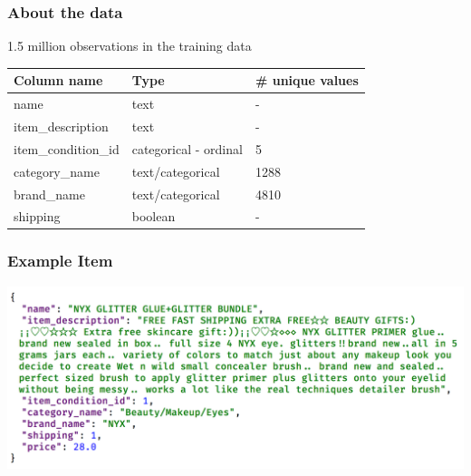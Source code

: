 \begin{frame}
\frametitle{About the data}


1.5 million observations in the training data 

\hfill \break

\begin{tabular}{lll}
Column name & Type & \# unique values \\ \hline
name & text & - \\
item\_description & text & - \\ 
item\_condition\_id & categorical - ordinal & 5 \\
category\_name & text/categorical & 1288 \\
brand\_name & text/categorical & 4810 \\
shipping & boolean & - \\ \hline
\end{tabular}
\end{frame}


\begin{frame}
\frametitle{Example Item}
\includegraphics[width=14cm]{img/data_sample.png}
\end{frame}
